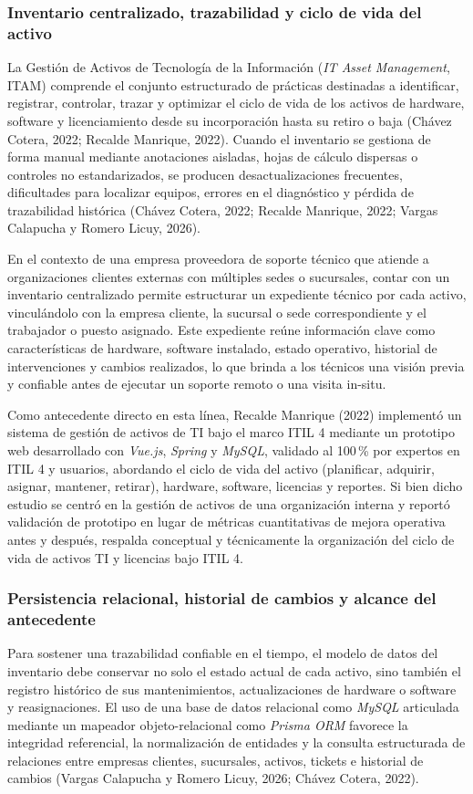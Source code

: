 \subsubsection{Inventario centralizado, trazabilidad y ciclo de vida del activo}
La Gestión de Activos de Tecnología de la Información (\textit{IT Asset Management}, ITAM) comprende el conjunto estructurado de prácticas destinadas a identificar, registrar, controlar, trazar y optimizar el ciclo de vida de los activos de hardware, software y licenciamiento desde su incorporación hasta su retiro o baja (Chávez Cotera, 2022; Recalde Manrique, 2022). Cuando el inventario se gestiona de forma manual mediante anotaciones aisladas, hojas de cálculo dispersas o controles no estandarizados, se producen desactualizaciones frecuentes, dificultades para localizar equipos, errores en el diagnóstico y pérdida de trazabilidad histórica (Chávez Cotera, 2022; Recalde Manrique, 2022; Vargas Calapucha y Romero Licuy, 2026).

En el contexto de una empresa proveedora de soporte técnico que atiende a organizaciones clientes externas con múltiples sedes o sucursales, contar con un inventario centralizado permite estructurar un expediente técnico por cada activo, vinculándolo con la empresa cliente, la sucursal o sede correspondiente y el trabajador o puesto asignado. Este expediente reúne información clave como características de hardware, software instalado, estado operativo, historial de intervenciones y cambios realizados, lo que brinda a los técnicos una visión previa y confiable antes de ejecutar un soporte remoto o una visita in-situ.

Como antecedente directo en esta línea, Recalde Manrique (2022) implementó un sistema de gestión de activos de TI bajo el marco ITIL 4 mediante un prototipo web desarrollado con \textit{Vue.js}, \textit{Spring} y \textit{MySQL}, validado al 100\,\% por expertos en ITIL 4 y usuarios, abordando el ciclo de vida del activo (planificar, adquirir, asignar, mantener, retirar), hardware, software, licencias y reportes. Si bien dicho estudio se centró en la gestión de activos de una organización interna y reportó validación de prototipo en lugar de métricas cuantitativas de mejora operativa antes y después, respalda conceptual y técnicamente la organización del ciclo de vida de activos TI y licencias bajo ITIL 4.

\subsubsection{Persistencia relacional, historial de cambios y alcance del antecedente}
Para sostener una trazabilidad confiable en el tiempo, el modelo de datos del inventario debe conservar no solo el estado actual de cada activo, sino también el registro histórico de sus mantenimientos, actualizaciones de hardware o software y reasignaciones. El uso de una base de datos relacional como \textit{MySQL} articulada mediante un mapeador objeto-relacional como \textit{Prisma ORM} favorece la integridad referencial, la normalización de entidades y la consulta estructurada de relaciones entre empresas clientes, sucursales, activos, tickets e historial de cambios (Vargas Calapucha y Romero Licuy, 2026; Chávez Cotera, 2022).

